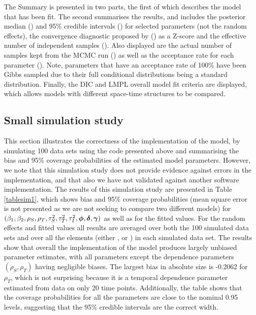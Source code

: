 \documentclass[article, nojss]{jss}
\newcommand{\bd}[1]{\ensuremath{\mbox{\boldmath $#1$}}}
\begin{document}
The Summary is presented in two parts, the first of which describes the model that has been fit. The second summarises the results, and includes the posterior median () and 95\% credible intervals () for selected parameters (not the random effects), the convergence diagnostic proposed by \cite{geweke1992} () as a Z-score and the effective number of independent samples (). Also displayed are the actual number of samples kept from the MCMC run  () as well as the acceptance rate for each parameter (). Note, parameters that have an acceptance rate of 100\% have been Gibbs sampled due to their full conditional distributions being a standard distribution. Finally, the DIC and LMPL overall model fit criteria are displayed, which allows models with different space-time structures to be compared. 


\subsection{Small simulation study}
This section illustrates the correctness of the  implementation of the  model, by simulating 100 data sets using the code presented above and summarising the bias and 95\% coverage probabilities of the estimated model parameters. However, we note that this simulation study does not provide evidence against errors in the implementation, and that also we have not validated  against another software implementation. The results of this simulation study are presented in Table \ref{tablesim1}, which shows bias and 95\% coverage probabilities (mean square error is not presented as we are not seeking to compare two different models) for $(\beta_1, \beta_2, \rho_S, \rho_T, \tau^2_S, \tau^2_T, \tau^2_I,  \bd{\phi}, \bd{\delta}, \bd{\gamma})$ as well as for the fitted values. For the random effects and fitted values all results are averaged over both the 100 simulated data sets and over all the elements (either ,  or ) in each simulated data set. The results show that overall the  implementation of the  model produces largely unbiased parameter estimates, with all parameters except the dependence parameters $(\rho_S, \rho_T)$ having negligible biases. The largest bias in absolute size is -0.2062 for $\rho_{T}$, which is not surprising because it is a temporal dependence parameter estimated from data on only 20 time points. Additionally, the table shows that the coverage probabilities for all the parameters are close to the nominal 0.95 levels, suggesting that the 95\% credible intervals are the correct width. 
\end{document}
